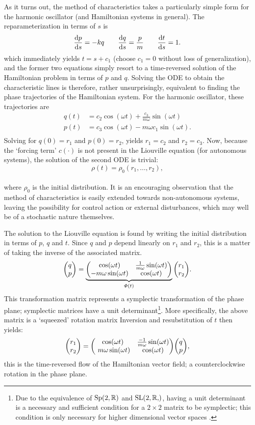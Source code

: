 As it turns out, the method of characteristics takes a particularly simple form for the harmonic oscillator (and Hamiltonian systems in general). The reparameterization in terms of $s$ is
\begin{equation}
        \dv{p}{s} = -kq \qquad \dv{q}{s} = \frac{p}{m} \qquad \dv{t}{s} = 1.
\end{equation}
which immediately yields $t = s + c_1$ (choose $c_1 = 0$ without loss of generalization), and the former two equations simply resort to a time-reversed solution of the Hamiltonian problem in terms of $p$ and $q$. Solving the ODE to obtain the characteristic lines is therefore, rather unsurprisingly, equivalent to finding the phase trajectories of the Hamiltonian system. For the harmonic oscillator, these trajectories are
\begin{equation}
    \begin{split}
        q(t) &= c_2\cos(\omega t) + \frac{c_3}{m\omega}\sin(\omega t)\\
        p(t) &= c_3\cos(\omega t) - m\omega c_1 \sin(\omega t). \\
    \end{split}
\end{equation}
Solving for $q(0) = r_1$ and $p(0) = r_2$, yields $r_1 = c_2$ and $r_2 = c_3$. Now, because the `forcing term' $c(\cdot)$ is not present in the Liouville equation (for autonomous systems), the solution of the second ODE is trivial:
$$ \rho(t) = \rho_0(r_1, \ldots, r_2), $$
\\
where $\rho_0$ is the initial distribution. It is an encouraging observation that the method of characteristics is easily extended towards non-autonomous systems, leaving the possibility for control action or external disturbances, which may well be of a stochastic nature themselves.

The solution to the Liouville equation is found by writing the initial distribution in terms of $p$, $q$ and $t$. Since $q$ and $p$ depend linearly on $r_1$ and $r_2$, this is a matter of taking the inverse of the associated matrix.
$$ 
    \mqty(q\\p) = 
    \underbrace{\mqty( 
        \cos(\omega t) & \frac{1}{m\omega}\sin(\omega t) \\
        -m\omega \sin(\omega t) & \cos(\omega t)
    )}_{\Phi(t)}
    \mqty(r_1\\r_2).
$$
This transformation matrix represents a symplectic transformation of the phase plane; symplectic matrices have a unit determinant\footnote{Due to the equivalence of $\mathrm{Sp}(2, \mathbb{R})$ and $\slgroup{2, \real}$, having a unit determinant is a necessary and sufficient condition for a $2\times2$ matrix to be symplectic; this condition is only necessary for higher dimensional vector spaces \cite{Arnold1989}.}. More specifically, the above matrix is a `squeezed' rotation matrix Inversion and resubstitution of $t$ then yields:
$$ \mqty(r_1\\r_2) = \mqty(\cos(\omega t) & \frac{-1}{m\omega}\sin(\omega t) \\\  m\omega\sin(\omega t) & \cos(\omega t) )\mqty(q\\p),$$
this is the time-reversed flow of the Hamiltonian vector field; a counterclockwise rotation in the phase plane.

